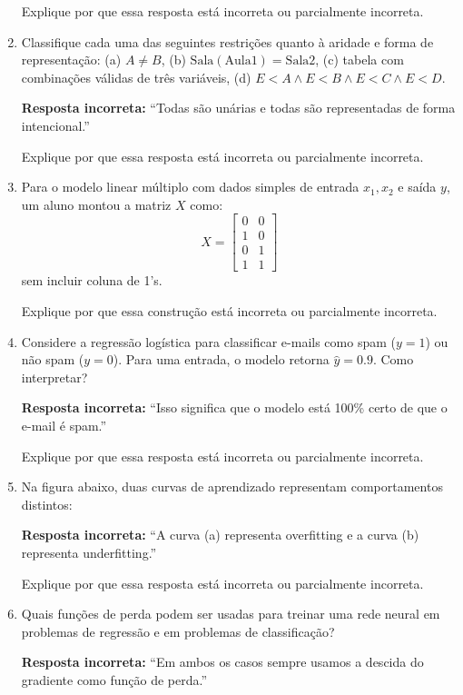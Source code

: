 \documentclass[12pt]{article}
\begin{document}
\begin{enumerate}
Explique por que essa resposta está incorreta ou parcialmente incorreta.

\item Classifique cada uma das seguintes restrições quanto à aridade e forma de representação:  
(a) \(A \neq B\), (b) \(\text{Sala}(\text{Aula1}) = \text{Sala2}\),  
(c) tabela com combinações válidas de três variáveis, (d) \(E<A \land E<B \land E<C \land E<D\).  

\textbf{Resposta incorreta:}  
“Todas são unárias e todas são representadas de forma intencional.”  

Explique por que essa resposta está incorreta ou parcialmente incorreta.

\item Para o modelo linear múltiplo com dados simples de entrada \(x_1,x_2\) e saída \(y\), um aluno montou a matriz \(X\) como:
\[
X = \begin{bmatrix}
0 & 0 \\
1 & 0 \\
0 & 1 \\
1 & 1
\end{bmatrix}
\]
sem incluir coluna de 1’s.  

Explique por que essa construção está incorreta ou parcialmente incorreta.

\item Considere a regressão logística para classificar e-mails como spam (\(y=1\)) ou não spam (\(y=0\)). Para uma entrada, o modelo retorna \(\hat{y} = 0.9\). Como interpretar?

\textbf{Resposta incorreta:}  
“Isso significa que o modelo está 100\% certo de que o e-mail é spam.”  

Explique por que essa resposta está incorreta ou parcialmente incorreta.

\item Na figura abaixo, duas curvas de aprendizado representam comportamentos distintos:  

\textbf{Resposta incorreta:}  
“A curva (a) representa overfitting e a curva (b) representa underfitting.”  

Explique por que essa resposta está incorreta ou parcialmente incorreta.

\item Quais funções de perda podem ser usadas para treinar uma rede neural em problemas de regressão e em problemas de classificação?

\textbf{Resposta incorreta:}  
“Em ambos os casos sempre usamos a descida do gradiente como função de perda.”  


\end{enumerate}
\end{document}
